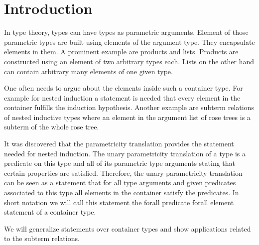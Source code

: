 
\section{Introduction}

In type theory, types can have types as parametric arguments.
Element of those parametric types are built using elements
of the argument type. They encapsulate elements in them.
A prominent example are products and lists.
Products are constructed using an element of two 
arbitrary types each.
Lists on the other hand can contain arbitrary many
elements of one given type.

One often needs to argue about the elements inside
such a container type.
For example for nested induction a statement is 
needed that every element in the container fulfills
the induction hypothesis.
Another example are subterm relations of nested 
inductive types where an element in the argument list
of rose trees is a subterm of the whole rose tree.

It was discovered that the parametricity translation
provides the statement needed for nested induction.
The unary parametricity translation of a type is a predicate
on this type and all of its parametric type arguments
stating that certain properties are satisfied.
Therefore, the unary parametricity translation
can be seen as a statement that for all type arguments
and given predicates associated to this type
all elements in the container satisfy the predicates.
In short notation we will call this statement the
forall predicate forall element statement of a container type.

We will generalize statements over container types
and show applications related to the subterm relations.




